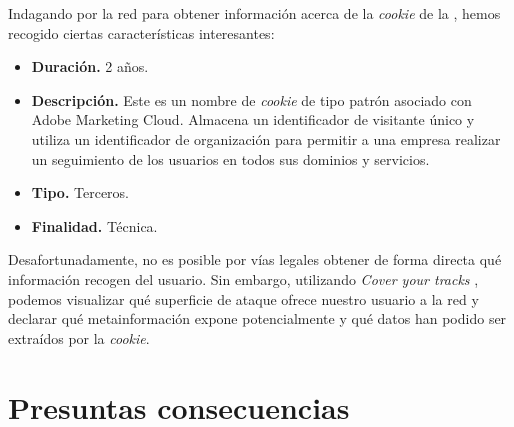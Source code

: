 \documentclass[es]{uc3mreport}
\begin{document}
\begin{report}
        \newpage
        Indagando por la red para obtener información acerca de la \textit{cookie} de la , hemos recogido ciertas características interesantes:
        \begin{itemize}
            \item \textbf{Duración.} 2 años.
            \item \textbf{Descripción.} Este es un nombre de \textit{cookie} de tipo patrón asociado con Adobe Marketing Cloud. Almacena un identificador de visitante único y utiliza un identificador de organización para permitir a una empresa realizar un seguimiento de los usuarios en todos sus dominios y servicios.
            \item \textbf{Tipo.} Terceros.
            \item \textbf{Finalidad.} Técnica.
        \end{itemize}
        Desafortunadamente, no es posible por vías legales obtener de forma directa qué información recogen del usuario. Sin embargo, utilizando \textit{Cover your tracks} , podemos visualizar qué superficie de ataque ofrece nuestro usuario a la red y declarar qué metainformación expone potencialmente y qué datos han podido ser extraídos por la \textit{cookie}.



        \section{Presuntas consecuencias}


    \end{report}

    \label{bibliography}
    \printbibliography[heading=bibintoc,title={Referencias}]
\end{document}
